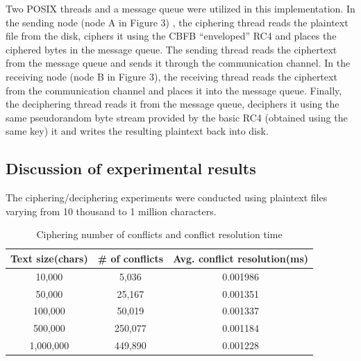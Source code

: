 \documentclass[conference]{IEEEtran}
\begin{document}
Two POSIX threads and a message queue were utilized in this implementation. In the sending node (node A in Figure 3) , the ciphering thread reads the plaintext file from the disk, ciphers it using the CBFB “enveloped” RC4 and places the ciphered bytes in the message queue. The sending thread reads the ciphertext from the message queue and sends it through the communication channel. In the receiving node (node B in Figure 3), the receiving thread reads the ciphertext from the communication channel and places it into the message queue. Finally, the deciphering thread reads it from the message queue, deciphers it using the same pseudorandom byte stream provided by the basic RC4 (obtained using the same key) it and writes the resulting plaintext back into disk.

\subsection{Discussion of experimental results}

The ciphering/deciphering experiments were conducted using plaintext files varying from 10 thousand to 1 million characters. 

\begin{table}[!t]
\centering
\begin{tabular}{|c|c|c|}
\hline
Text size(chars) & \# of conflicts & Avg. conflict resolution(ms) \\ \hline
10,000  & 5,036 & 0.001986                                                               \\ \hline
50,000  & 25,167 & 0.001351                                                                 \\ \hline
100,000 & 50,019 & 0.001337                                                                \\ \hline
500,000 & 250,077 & 0.001184                                                                 \\ \hline
1,000,000 & 449,890 & 0.001228                                                               \\ \hline
\end{tabular}
\caption{Ciphering number of conflicts and conflict resolution time}
\label{conflict-amount}
\end{table}
\end{document}
